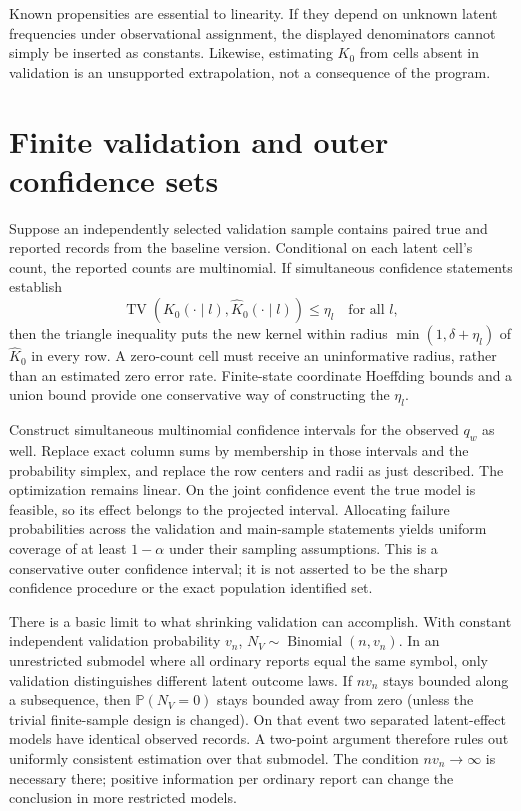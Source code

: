 \documentclass[11pt]{article}
\newcommand{\Prb}{\mathbb P}
\begin{document}
Known propensities are essential to linearity. If they depend on unknown latent frequencies under observational assignment, the displayed denominators cannot simply be inserted as constants. Likewise, estimating $K_0$ from cells absent in validation is an unsupported extrapolation, not a consequence of the program.

\section*{Finite validation and outer confidence sets}
Suppose an independently selected validation sample contains paired true and reported records from the baseline version. Conditional on each latent cell's count, the reported counts are multinomial. If simultaneous confidence statements establish
\[
 \operatorname{TV}(K_0(\cdot\mid l),\widehat K_0(\cdot\mid l))
 \leq\eta_l\quad\text{for all }l,
\]
then the triangle inequality puts the new kernel within radius
$\min(1,\delta+\eta_l)$ of $\widehat K_0$ in every row. A zero-count cell must receive an uninformative radius, rather than an estimated zero error rate. Finite-state coordinate Hoeffding bounds and a union bound provide one conservative way of constructing the $\eta_l$.

Construct simultaneous multinomial confidence intervals for the observed $q_w$ as well. Replace exact column sums by membership in those intervals and the probability simplex, and replace the row centers and radii as just described. The optimization remains linear. On the joint confidence event the true model is feasible, so its effect belongs to the projected interval. Allocating failure probabilities across the validation and main-sample statements yields uniform coverage of at least $1-\alpha$ under their sampling assumptions. This is a conservative outer confidence interval; it is not asserted to be the sharp confidence procedure or the exact population identified set.

There is a basic limit to what shrinking validation can accomplish. With constant independent validation probability $v_n$, $N_V\sim\operatorname{Binomial}(n,v_n)$. In an unrestricted submodel where all ordinary reports equal the same symbol, only validation distinguishes different latent outcome laws. If $nv_n$ stays bounded along a subsequence, then $\Prb(N_V=0)$ stays bounded away from zero (unless the trivial finite-sample design is changed). On that event two separated latent-effect models have identical observed records. A two-point argument therefore rules out uniformly consistent estimation over that submodel. The condition $nv_n\to\infty$ is necessary there; positive information per ordinary report can change the conclusion in more restricted models.
\end{document}
